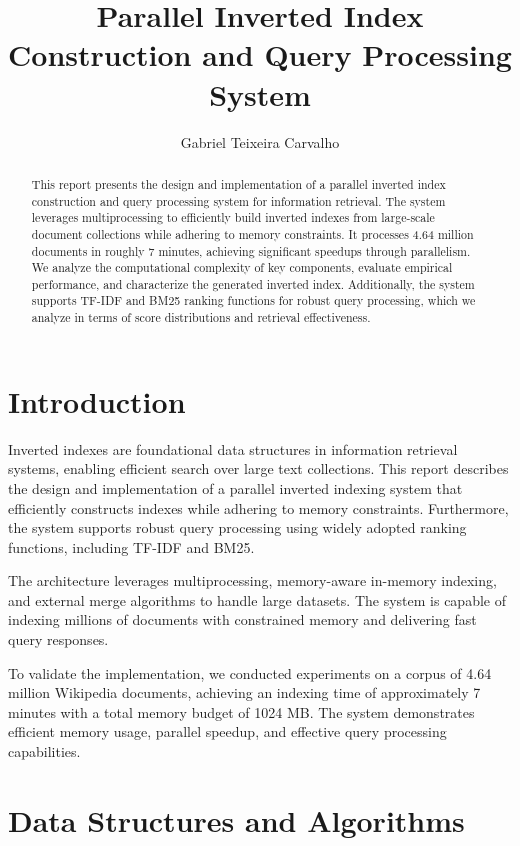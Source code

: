 \documentclass[sigconf]{acmart}
\title{Parallel Inverted Index Construction and Query Processing System}
\author{Gabriel Teixeira Carvalho}
\affiliation{%
  \institution{Universidade Federal de Minas Gerais}
  \city{Belo Horizonte}
  \state{MG}
  \country{Brazil}
}
\begin{document}
\begin{abstract}
This report presents the design and implementation of a parallel inverted index construction and query processing system for information retrieval. The system leverages multiprocessing to efficiently build inverted indexes from large-scale document collections while adhering to memory constraints. It processes 4.64 million documents in roughly 7 minutes, achieving significant speedups through parallelism. We analyze the computational complexity of key components, evaluate empirical performance, and characterize the generated inverted index. Additionally, the system supports TF-IDF and BM25 ranking functions for robust query processing, which we analyze in terms of score distributions and retrieval effectiveness.
\end{abstract}


\maketitle
{}

\section{Introduction}
Inverted indexes are foundational data structures in information retrieval systems, enabling efficient search over large text collections. This report describes the design and implementation of a parallel inverted indexing system that efficiently constructs indexes while adhering to memory constraints. Furthermore, the system supports robust query processing using widely adopted ranking functions, including TF-IDF and BM25.

The architecture leverages multiprocessing, memory-aware in-memory indexing, and external merge algorithms to handle large datasets. The system is capable of indexing millions of documents with constrained memory and delivering fast query responses.

To validate the implementation, we conducted experiments on a corpus of 4.64 million Wikipedia documents, achieving an indexing time of approximately 7 minutes with a total memory budget of 1024 MB. The system demonstrates efficient memory usage, parallel speedup, and effective query processing capabilities.

\section{Data Structures and Algorithms}
\end{document}
